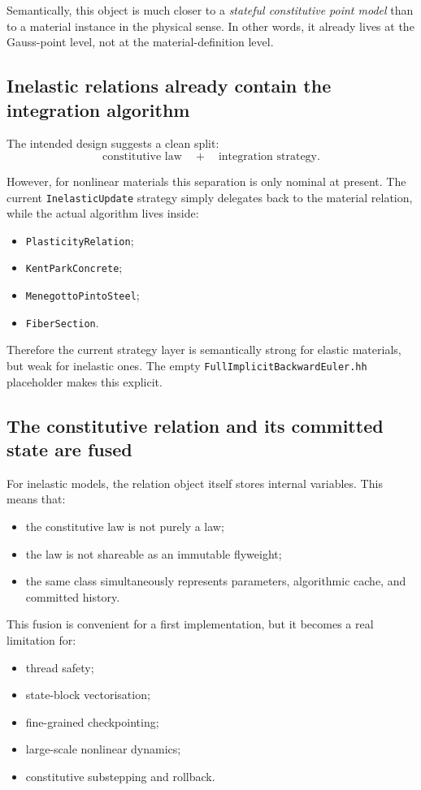 Semantically, this object is much closer to a
\emph{stateful constitutive point model} than to a material instance in the
physical sense.  In other words, it already lives at the Gauss-point level,
not at the material-definition level.

\subsection{Inelastic relations already contain the integration algorithm}

The intended design suggests a clean split:
\[
\text{constitutive law} \quad + \quad \text{integration strategy}.
\]

However, for nonlinear materials this separation is only nominal at present.
The current \texttt{InelasticUpdate} strategy simply delegates back to the
material relation, while the actual algorithm lives inside:
\begin{itemize}
  \item \texttt{PlasticityRelation};
  \item \texttt{KentParkConcrete};
  \item \texttt{MenegottoPintoSteel};
  \item \texttt{FiberSection}.
\end{itemize}

Therefore the current strategy layer is semantically strong for elastic
materials, but weak for inelastic ones.  The empty
\texttt{FullImplicitBackwardEuler.hh} placeholder makes this explicit.

\subsection{The constitutive relation and its committed state are fused}

For inelastic models, the relation object itself stores internal variables.
This means that:
\begin{itemize}
  \item the constitutive law is not purely a law;
  \item the law is not shareable as an immutable flyweight;
  \item the same class simultaneously represents parameters, algorithmic cache,
        and committed history.
\end{itemize}

This fusion is convenient for a first implementation, but it becomes a real
limitation for:
\begin{itemize}
  \item thread safety;
  \item state-block vectorisation;
  \item fine-grained checkpointing;
  \item large-scale nonlinear dynamics;
  \item constitutive substepping and rollback.
\end{itemize}

